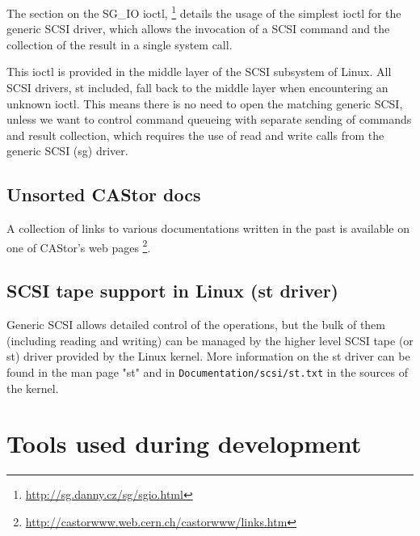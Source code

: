 The section on the SG\_IO ioctl, \footnote{ \href{http://sg.danny.cz/sg/sg\textunderscore{}io.html}{http://sg.danny.cz/sg/sg\textunderscore{}io.html} } details the usage of the 
simplest ioctl for the generic SCSI driver, which allows the invocation of a SCSI command and the collection of the 
result in a single system call.

This ioctl is provided in the middle layer of the SCSI subsystem of Linux. All SCSI drivers, st included, fall back
to the middle layer when encountering an unknown ioctl. This means there is no need to open the matching generic SCSI,
unless we want to control command queueing with separate sending of commands and result collection, which
requires the use of read and write calls from the generic SCSI (sg) driver.

\subsection{Unsorted CAStor docs}
A collection of links to various documentations written in the past is available on one of CAStor's web pages
       \footnote{ \href{http://castorwww.web.cern.ch/castorwww/links.htm}{http://castorwww.web.cern.ch/castorwww/links.htm} }.

\subsection{SCSI tape support in Linux (st driver)}
Generic SCSI allows detailed control of the operations, but the bulk of them (including reading and
writing) can be managed by the higher level SCSI tape (or st) driver provided by the Linux kernel.
More information on the st driver can be found in the man page "st" and in \verb#Documentation/scsi/st.txt#
in the sources of the kernel.

\section{Tools used during development}
